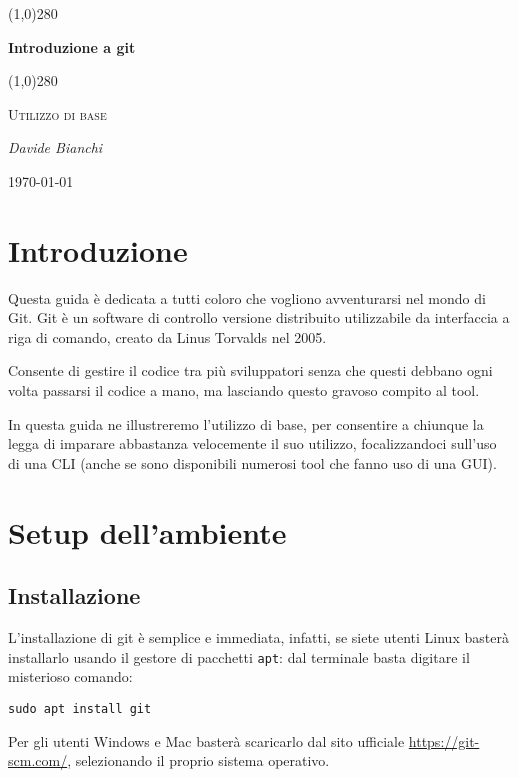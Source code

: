 \documentclass[a4paper, 11pt]{article}
\begin{document}
 \clearpage
 \begin{titlepage}
 	\centering
 	\vspace*{5cm}
 	\line(1,0){280} \\
 	{\huge\bfseries Introduzione a git\par}
 	\line(1,0){280} \\
 	\vspace{0.5cm}
 	{\scshape\Large Utilizzo di base\par}
 	\vspace{2cm}
 	{\Large\itshape Davide Bianchi\par}
 	\vspace{1cm}
 	
 	\vspace{5cm}
 	\vspace*{\fill}
 	{\large \today\par}
 \end{titlepage}
 \thispagestyle{empty}
 \newpage
 \tableofcontents
 \newpage
	
	\section{Introduzione}
	Questa guida è dedicata a tutti coloro che vogliono avventurarsi nel mondo di Git. Git è un software di controllo versione distribuito utilizzabile da interfaccia a riga di comando, creato da Linus Torvalds nel 2005.
	
	Consente di gestire il codice tra più sviluppatori senza che questi debbano ogni volta passarsi il codice a mano, ma lasciando questo gravoso compito al tool.
	
	In questa guida ne illustreremo l'utilizzo di base, per consentire a chiunque la legga di imparare abbastanza velocemente il suo utilizzo, focalizzandoci sull'uso di una CLI (anche se sono disponibili numerosi tool che fanno uso di una GUI).
	
	\section{Setup dell'ambiente}
	\subsection{Installazione}
	L'installazione di git è semplice e immediata, infatti, se siete utenti Linux basterà installarlo usando il gestore di pacchetti \lstinline|apt|: dal terminale basta digitare il misterioso comando: \begin{lstlisting}
sudo apt install git
	\end{lstlisting}
	Per gli utenti Windows e Mac basterà scaricarlo dal sito ufficiale \url{https://git-scm.com/}, selezionando il proprio sistema operativo.
	
\end{document}
